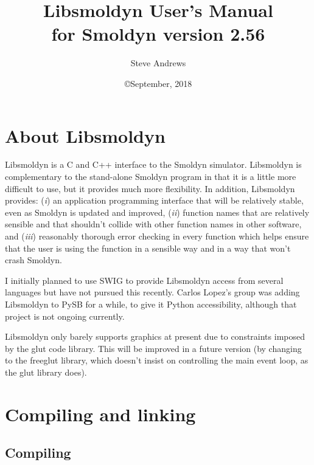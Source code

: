 \documentclass {book}
\begin{document}



\title{\textbf{Libsmoldyn User's Manual} \\ \large for Smoldyn version 2.56}
\date{\copyright September, 2018}
\author{Steve Andrews}
\maketitle

\tableofcontents


\chapter{About Libsmoldyn}
Libsmoldyn is a C and C++ interface to the Smoldyn simulator.  Libsmoldyn is complementary to the stand-alone Smoldyn program in that it is a little more difficult to use, but it provides much more flexibility.  In addition, Libsmoldyn provides: (\emph{i}) an application programming interface that will be relatively stable, even as Smoldyn is updated and improved, (\emph{ii}) function names that are relatively sensible and that shouldn't collide with other function names in other software, and (\emph{iii}) reasonably thorough error checking in every function which helps ensure that the user is using the function in a sensible way and in a way that won't crash Smoldyn.

I initially planned to use SWIG to provide Libsmoldyn access from several languages but have not pursued this recently.  Carlos Lopez's group was adding Libsmoldyn to PySB for a while, to give it Python accessibility, although that project is not ongoing currently.

Libsmoldyn only barely supports graphics at present due to constraints imposed by the glut code library.  This will be improved in a future version (by changing to the freeglut library, which doesn't insist on controlling the main event loop, as the glut library does).


\chapter{Compiling and linking}

\section{Compiling}
\end{document}
